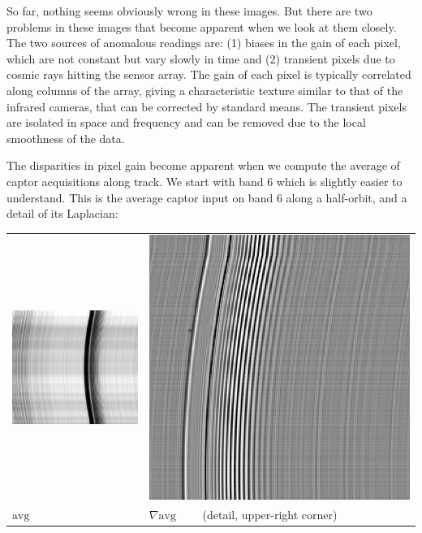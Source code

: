 \documentclass[a4paper]{article}    %
\theoremstyle{note}
\theoremstyle{plain}
\begin{document}
So far, nothing seems obviously wrong in these images.  But there are two
problems in these images that become apparent when we look at them closely.
The two sources of anomalous readings are: (1) biases in the gain of each
pixel, which are not constant but vary slowly in time and (2) transient
pixels due to cosmic rays hitting the sensor array.  The gain of each pixel
is typically correlated along columns of the array, giving a characteristic
texture similar to that of the infrared cameras, that can be corrected by
standard means.  The transient pixels are isolated in space and frequency and
can be removed due to the local smoothness of the data.

The disparities in pixel gain become apparent when we compute the average
of captor acquisitions along track.  We start with band 6 which is slightly
easier to understand.  This is the average captor input on band 6 along a
half-orbit, and a detail of its Laplacian:

\begin{tabular}{ll}
	\includegraphics[width=0.5\linewidth]{f/b6_avgs.png} &
	\includegraphics[width=0.5\linewidth]{f/b6_lapavgs.png} \\
	$\mathrm{avg}$ & $\nabla\mathrm{avg}\qquad$ (detail, upper-right corner)
\end{tabular}
\end{document}

